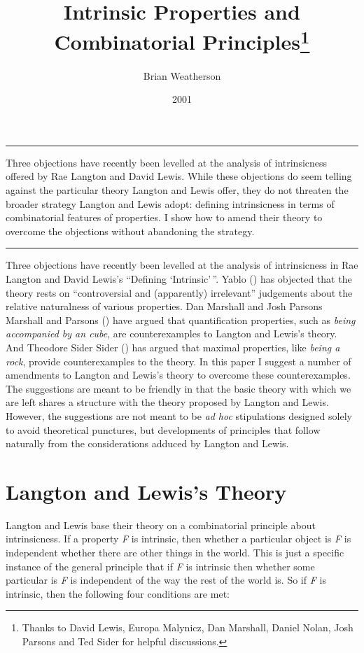 \documentclass[
  10pt,
  letterpaper,
  DIV=11,
  numbers=noendperiod,
  twoside]{scrartcl}
\title{Intrinsic Properties and Combinatorial Principles\thanks{Thanks
to David Lewis, Europa Malynicz, Dan Marshall, Daniel Nolan, Josh
Parsons and Ted Sider for helpful discussions.}}
\author{Brian Weatherson}
\date{2001}
\renewenvironment{abstract}
 {\vspace{-1.25cm}
 \quotation\small\noindent\rule{\linewidth}{.5pt}\par\smallskip
 \noindent }
 {\par\noindent\rule{\linewidth}{.5pt}\endquotation}
\begin{document}
\maketitle
\begin{abstract}
Three objections have recently been levelled at the analysis of
intrinsicness offered by Rae Langton and David Lewis. While these
objections do seem telling against the particular theory Langton and
Lewis offer, they do not threaten the broader strategy Langton and Lewis
adopt: defining intrinsicness in terms of combinatorial features of
properties. I show how to amend their theory to overcome the objections
without abandoning the strategy.
\end{abstract}

Three objections have recently been levelled at the analysis of
intrinsicness in Rae Langton and David Lewis's ``Defining
`Intrinsic'\,''. Yablo () has objected
that the theory rests on ``controversial and (apparently) irrelevant''
judgements about the relative naturalness of various properties. Dan
Marshall and Josh Parsons Marshall and Parsons
() have argued that quantification
properties, such as \emph{being accompanied by an cube}, are
counterexamples to Langton and Lewis's theory. And Theodore Sider Sider
() has argued that maximal properties,
like \emph{being a rock}, provide counterexamples to the theory. In this
paper I suggest a number of amendments to Langton and Lewis's theory to
overcome these counterexamples. The suggestions are meant to be friendly
in that the basic theory with which we are left shares a structure with
the theory proposed by Langton and Lewis. However, the suggestions are
not meant to be \emph{ad hoc} stipulations designed solely to avoid
theoretical punctures, but developments of principles that follow
naturally from the considerations adduced by Langton and Lewis.

\section{Langton and Lewis's Theory}\label{langton-and-lewiss-theory}

Langton and Lewis base their theory on a combinatorial principle about
intrinsicness. If a property \emph{F} is intrinsic, then whether a
particular object is \emph{F} is independent whether there are other
things in the world. This is just a specific instance of the general
principle that if \emph{F} is intrinsic then whether some particular is
\emph{F} is independent of the way the rest of the world is. So if
\emph{F} is intrinsic, then the following four conditions are met:
\end{document}
